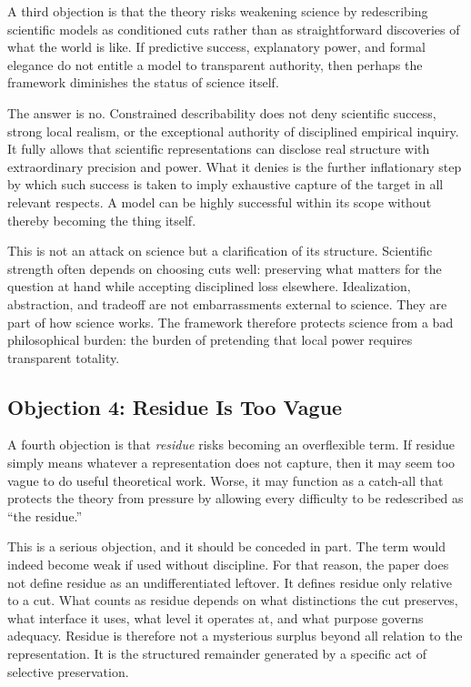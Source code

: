\documentclass[11pt]{article}
\renewcommand{\emph}[1]{\textit{#1}}
\begin{document}
A third objection is that the theory risks weakening science by redescribing scientific models as conditioned cuts rather than as straightforward discoveries of what the world is like. If predictive success, explanatory power, and formal elegance do not entitle a model to transparent authority, then perhaps the framework diminishes the status of science itself.

The answer is no. Constrained describability does not deny scientific success, strong local realism, or the exceptional authority of disciplined empirical inquiry. It fully allows that scientific representations can disclose real structure with extraordinary precision and power. What it denies is the further inflationary step by which such success is taken to imply exhaustive capture of the target in all relevant respects. A model can be highly successful within its scope without thereby becoming the thing itself. \cite{chakravartty_scientific_realism_sep,frigg_hartmann_models_sep,frigg_nguyen_scientific_representation_sep}

This is not an attack on science but a clarification of its structure. Scientific strength often depends on choosing cuts well: preserving what matters for the question at hand while accepting disciplined loss elsewhere. Idealization, abstraction, and tradeoff are not embarrassments external to science. They are part of how science works. The framework therefore protects science from a bad philosophical burden: the burden of pretending that local power requires transparent totality.

\subsection{Objection 4: Residue Is Too Vague}

A fourth objection is that \emph{residue} risks becoming an overflexible term. If residue simply means whatever a representation does not capture, then it may seem too vague to do useful theoretical work. Worse, it may function as a catch-all that protects the theory from pressure by allowing every difficulty to be redescribed as ``the residue.''

This is a serious objection, and it should be conceded in part. The term would indeed become weak if used without discipline. For that reason, the paper does not define residue as an undifferentiated leftover. It defines residue only relative to a cut. What counts as residue depends on what distinctions the cut preserves, what interface it uses, what level it operates at, and what purpose governs adequacy. Residue is therefore not a mysterious surplus beyond all relation to the representation. It is the structured remainder generated by a specific act of selective preservation.
\end{document}

